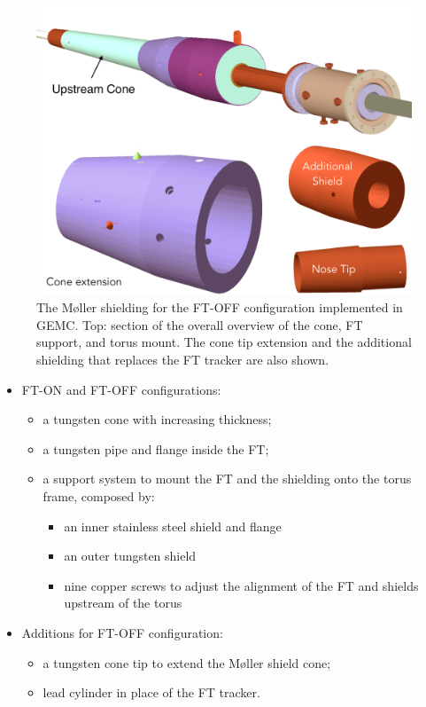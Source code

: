 \begin{figure}
	\centering
	\includegraphics[width=0.99\columnwidth,keepaspectratio]{img/moellerShieldingFTOff.png}
        \caption{The M\o ller shielding for the FT-OFF configuration implemented in GEMC. Top: section of the overall
          overview of the cone, FT support, and torus mount. The cone tip extension and the additional shielding that replaces
          the FT tracker are also shown.}
	\label{fig:moellerShieldingFTOff}
\end{figure}

\begin{itemize}
	\item FT-ON and FT-OFF configurations:
	\begin{itemize}
		\item a tungsten cone with increasing thickness;
		\item a tungsten pipe and flange inside the FT;
		\item a support system to mount the FT and the shielding onto the torus frame, composed by:
		\begin{itemize}
			\item an inner stainless steel shield and flange
			\item an outer tungsten shield
			\item nine copper screws to adjust the alignment of the FT and shields upstream of the torus
		\end{itemize}
	\end{itemize}
	\item Additions for FT-OFF configuration:
	\begin{itemize}
	\item a tungsten cone tip to extend the M\o ller shield cone;
	\item lead cylinder in place of the FT tracker.
	\end{itemize}

\end{itemize}

